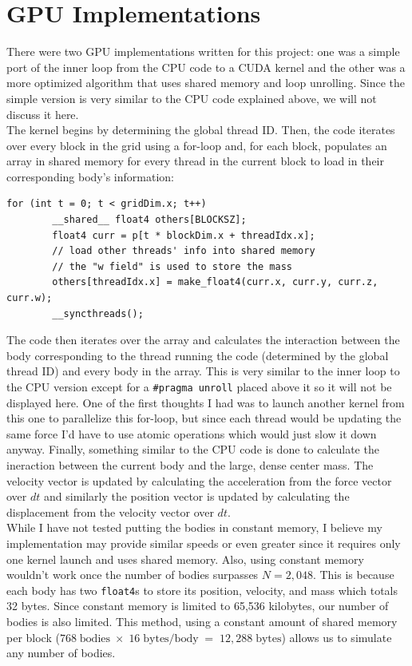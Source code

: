 \section{GPU Implementations}
There were two GPU implementations written for this project: one was a simple port of the inner loop from the CPU code to a CUDA kernel and the other was a more optimized
algorithm that uses shared memory and loop unrolling. Since the simple version is very similar to the CPU code explained above, we will not discuss it here. \\
\indent The kernel begins by determining the global thread ID. Then, the code iterates over every block in the grid using a for-loop and, for each block, populates an array in shared memory for every thread in the current block to load in their corresponding body's information:
\begin{lstlisting}[style = cudastyle]
    for (int t = 0; t < gridDim.x; t++)
        __shared__ float4 others[BLOCKSZ];
        float4 curr = p[t * blockDim.x + threadIdx.x];
        // load other threads' info into shared memory
        // the "w field" is used to store the mass
        others[threadIdx.x] = make_float4(curr.x, curr.y, curr.z, curr.w);
        __syncthreads();
\end{lstlisting}
The code then iterates over the array and calculates the interaction between the body corresponding to the thread running the code (determined by the global thread ID) and every body in the array. This is very similar to the inner loop to the CPU version except for a \verb|#pragma unroll| placed above it so it will not be displayed here. One of the first thoughts I had was to launch another kernel from this one to parallelize this for-loop, but since each thread would be updating the same force I'd have to use atomic operations which would just slow it down anyway. Finally, something similar to the CPU code is done to calculate the ineraction between the current body and the large, dense center mass. The velocity vector is updated by calculating the acceleration from the force vector over $dt$ and similarly the position vector is updated by calculating the displacement from the velocity vector over $dt$.\\
\indent While I have not tested putting the bodies in constant memory, I believe my implementation may provide similar speeds or even greater since it requires only one kernel launch and uses shared memory. Also, using constant memory wouldn't work once the number of bodies surpasses $N = 2,048$. This is because each body has two \verb|float4|s to store its position, velocity, and mass which totals 32 bytes. Since constant memory is limited to 65,536 kilobytes, our number of bodies is also limited. This method, using a constant amount of shared memory per block ($768\;\text{bodies}\;\times\;16\;\text{bytes/body}\;=\;12,288\;\text{bytes}$) allows us to simulate any number of bodies.

